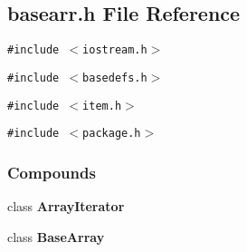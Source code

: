 \subsection{basearr.h File Reference}
\label{basearr.h}
{\tt \#include $<$iostream.h$>$}\par
{\tt \#include $<$basedefs.h$>$}\par
{\tt \#include $<$item.h$>$}\par
{\tt \#include $<$package.h$>$}\par
\subsubsection*{Compounds}
\begin{CompactItemize}
\item 
class {\bf Array\-Iterator}
\item 
class {\bf Base\-Array}
\end{CompactItemize}
